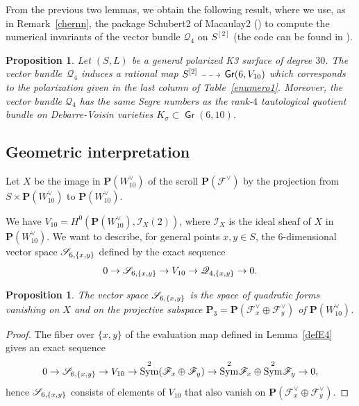 \documentclass[11pt]{article}
\makeatletter
\let\mathcal\mathscr
\newcommand{\dradpl}{{\!\!\xymatrix@C=8mm{\ar@{-->}[r]&}\!\!}}
\newcommand{\dratst}{{\,\mathrel{\scalebox{.8}{$\dradpl$}}\,}}
\newcommand{\drascst}{{\,\mathrel{\scalebox{.6}{$\dradpl$}}\,}}
\newcommand{\dra}{\mathchoice{\dradpl}{\dratst}{\drascst}{\drascst}}
\newtheorem{prop}[lemm]{Proposition}
\theoremstyle{definition}
\renewcommand\P{{\mathbf P}}\let\PP\P
\newcommand\cF{\mathcal{F}}
\newcommand\cI{\mathcal{I}}
\newcommand\cQ{\mathcal{Q}}\let\quotauto\cQ
\DeclareMathOperator{\Gr}{\mathsf{Gr}}
\let\dual\vee
\DeclareMathOperator{\Sym}{Sym}
\newcommand\hilbS{S^{[2]}}
\renewcommand{\dratst}{\mathrel{\scalebox{.8}{$\dradpl$}}}
\renewcommand{\drascst}{\mathrel{\scalebox{.6}{$\dradpl$}}}
\makeatother
\begin{document}
From the previous two lemmas, we obtain the following result, where we use, as in Remark~\ref{chernn}, the package
Schubert2 of Macaulay2 (\cite{macaulay2}) to compute the numerical invariants of
the vector bundle $\cQ_4$ on $\hilbS$ (the code can be found in \cite{comp}).

\begin{prop}
Let $(S,L)$ be a general polarized K3 surface of degree $30$.
The vector bundle~$\cQ_4$ induces a rational map $\hilbS\dra\Gr(6,V_{10})$ which corresponds to
the polarization given in the last column of Table~\ref{enumero1}.
Moreover,
the vector bundle $\cQ_4$ has the same Segre numbers as the rank-$4$
tautological quotient bundle on Debarre-Voisin varieties $K_\sigma\subset
\Gr(6,10)$.
\end{prop}

\subsection{Geometric interpretation}
Let $X$ be the image in $\P(W_{10}^{\dual})$ of the scroll $\P(\cF^{\dual})$ by the projection from $S\times \P(W_{10}^{\dual})$ to $\P(W_{10}^{\dual})$.

We have $V_{10} = H^0(\PP(W_{10}^\dual),\cI_X(2))$, where $\cI_X$ is the ideal sheaf of $X$ in
$\PP(W_{10}^\dual)$. We want to describe, for general points $x,y\in
S$, the $6$-dimensional vector space $\soustauto_{6,\{x,y\}}$ defined by the exact sequence
\[
0 \to\soustauto_{6,\{x,y\}}\to V_{10} \to \quotauto_{4,\{x,y\}}\to 0.
\]

\begin{prop}
The vector space $\soustauto_{6,\{x,y\}} $ is the space of quadratic forms vanishing on $X$ and on the projective subspace $\PP_3=\PP(\cF_x^\dual \oplus \cF_y^\dual)$ of $\P(W_{10}^{\dual})$.
\end{prop}

\begin{proof}
The fiber over $\{x,y\}$ of the evaluation map defined in
Lemma~\ref{defE4} gives an exact sequence
\[
0 \to \soustauto_{6,\{x,y\}} \to V_{10} \to \Sym^2(\cF_x \oplus \cF_y) \to \Sym^2\! \cF_x \oplus \Sym^2\!\cF_y \to 0,
\]
hence $\soustauto_{6,\{x,y\}}$ consists of elements of $V_{10} $ that also vanish on $\PP(\cF_x^\dual \oplus \cF_y^\dual)$.
\end{proof}


\end{document}
